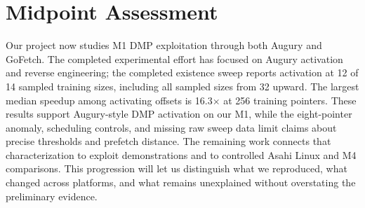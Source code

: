 \section{Midpoint Assessment}
Our project now studies M1 DMP exploitation through both Augury and GoFetch. The completed experimental effort has focused on Augury activation and reverse engineering; the completed existence sweep reports activation at 12 of 14 sampled training sizes, including all sampled sizes from 32 upward. The largest median speedup among activating offsets is 16.3$\times$ at 256 training pointers. These results support Augury-style DMP activation on our M1, while the eight-pointer anomaly, scheduling controls, and missing raw sweep data limit claims about precise thresholds and prefetch distance. The remaining work connects that characterization to exploit demonstrations and to controlled Asahi Linux and M4 comparisons. This progression will let us distinguish what we reproduced, what changed across platforms, and what remains unexplained without overstating the preliminary evidence.
